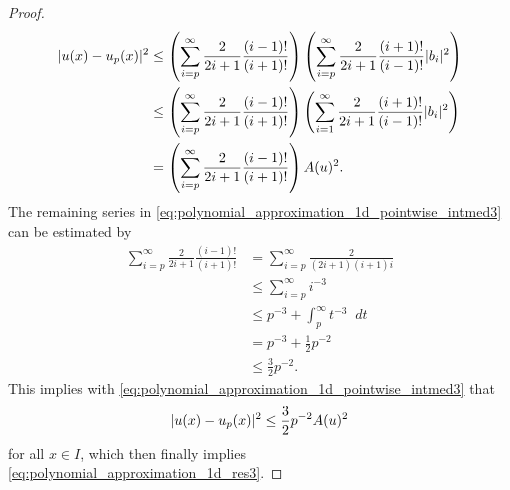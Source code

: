 \documentclass[english, 12pt, a4paper, sci, utf8, a-2b, online]{aaltothesis}
\theoremstyle{definition}
\theoremstyle{plain}
\DeclarePairedDelimiter\abs{\lvert}{\rvert}
\newcommand*\diff{\mathop{}\!d}
\numberwithin{equation}{section}
\begin{document}
\begin{proof}
    \begin{align}
        \abs{u(x) - u_p(x)}^2
        &\leq \left( \sum_{i=p}^{\infty} \frac{2}{2i+1} \frac{(i-1)!}{(i+1)!}
            \right)
            \left( \sum_{i=p}^{\infty} \frac{2}{2i+1} \frac{(i+1)!}{(i-1)!} 
            \abs{b_i}^2 \right) \nonumber \\
        &\leq \left( \sum_{i=p}^{\infty} \frac{2}{2i+1} \frac{(i-1)!}{(i+1)!}
            \right)
            \left( \sum_{i=1}^{\infty} \frac{2}{2i+1} \frac{(i+1)!}{(i-1)!} 
            \abs{b_i}^2 \right) \nonumber \\
        \label{eq:polynomial_approximation_1d_pointwise_intmed3}
        &= \left( \sum_{i=p}^{\infty} \frac{2}{2i+1} \frac{(i-1)!}{(i+1)!}
            \right) A(u)^2.
    \end{align}
    The remaining series in \eqref{eq:polynomial_approximation_1d_pointwise_intmed3}
    can be estimated by
    \begin{align*}
        \sum_{i=p}^{\infty} \frac{2}{2i+1} \frac{(i-1)!}{(i+1)!}
        &= \sum_{i=p}^{\infty} \frac{2}{(2i+1)(i+1)i} \\
        &\leq \sum_{i=p}^{\infty} i^{-3} \\
        &\leq p^{-3} + \int_{p}^{\infty} t^{-3} \diff t \\
        &= p^{-3} + \frac{1}{2} p^{-2} \\
        &\leq \frac{3}{2} p^{-2}.
    \end{align*}
    This implies with \eqref{eq:polynomial_approximation_1d_pointwise_intmed3} that
    \begin{equation*}
        \abs{u(x) - u_p(x)}^2
        \leq \frac{3}{2} p^{-2} A(u)^2
    \end{equation*}
    for all $x \in I$, which then finally implies 
    \eqref{eq:polynomial_approximation_1d_res3}.
\end{proof}
\end{document}
